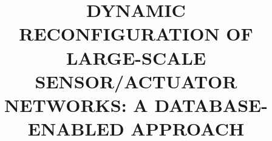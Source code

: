 \documentclass[a4paper, 12pt, oneside]{Thesis}  %
\begin{document}
\frontmatter	  %
\title  {DYNAMIC RECONFIGURATION OF LARGE-SCALE SENSOR/ACTUATOR NETWORKS: A DATABASE-ENABLED APPROACH}

\maketitle


\fancyhead{}  %
\rhead{\thepage}  %
\lhead{}  %
\pagestyle{fancy}  %

\addtocounter{page}{1}
\end{document}
